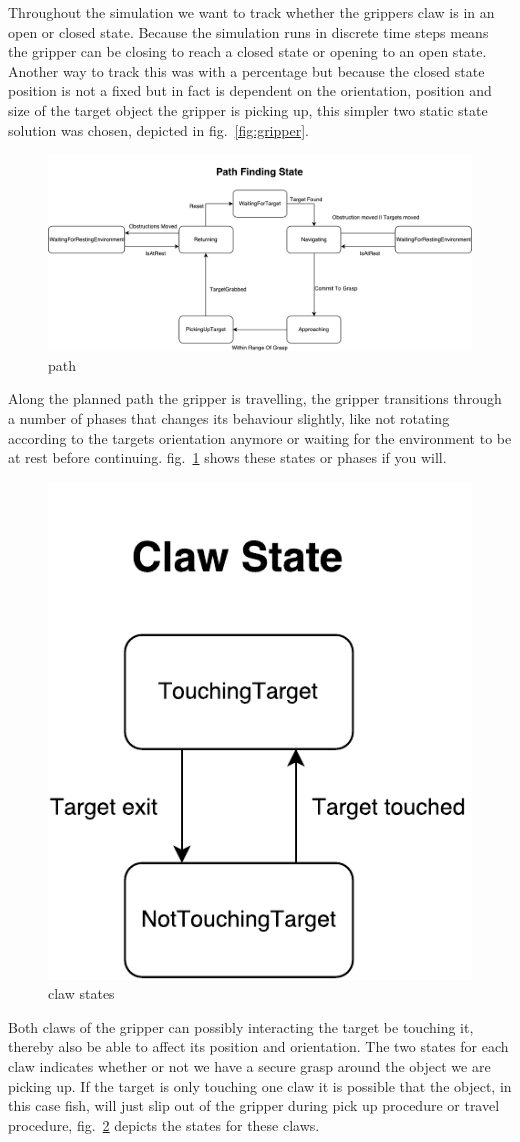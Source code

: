 Throughout the simulation we want to track whether the grippers claw is in an open or closed state. Because the simulation runs in discrete time steps means the gripper can be closing to reach a closed state or opening to an open state. Another way to track this was with a percentage but because the closed state position is not a fixed but in fact is dependent on the orientation, position and size of the target object the gripper is picking up, this simpler two static state solution was chosen, depicted in fig.~\ref{fig:gripper}.


\begin{figure}
\centering
\includegraphics[width=\linewidth]{figures/statediagrams/path.pdf}
\caption{path}
\label{fig:path}
\end{figure}

Along the planned path the gripper is travelling, the gripper transitions through a number of phases that changes its behaviour slightly, like not rotating according to the targets orientation anymore or waiting for the environment to be at rest before continuing. fig.~\ref{fig:path} shows these states or phases if you will.

\begin{figure}
\centering
\includegraphics[width=.3\linewidth]{figures/statediagrams/claw-states.pdf}
\caption{claw states}
\label{fig:claw}
\end{figure}

Both claws of the gripper can possibly interacting the target be touching it, thereby also be able to affect its position and orientation. The two states for each claw indicates whether or not we have a secure grasp around the object we are picking up. If the target is only touching one claw it is possible that the object, in this case fish, will just slip out of the gripper during pick up procedure or travel procedure, fig.~\ref{fig:claw} depicts the states for these claws.

